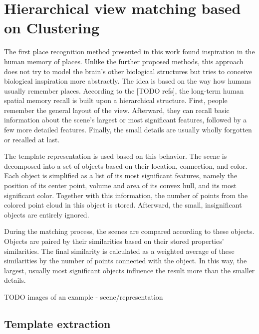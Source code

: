 \section{Hierarchical view matching based on Clustering}

The first place recognition method presented in this work found inspiration in the human memory of places. Unlike the further proposed methods, this approach does not try to model the brain's other biological structures but tries to conceive biological inspiration more abstractly. The idea is based on the way how humans usually remember places. According to the [TODO refs], the long-term human spatial memory recall is built upon a hierarchical structure. First, people remember the general layout of the view. Afterward, they can recall basic information about the scene's largest or most significant features, followed by a few more detailed features. Finally, the small details are usually wholly forgotten or recalled at last.\par
The template representation is used based on this behavior. The scene is decomposed into a set of objects based on their location, connection, and color. Each object is simplified as a list of its most significant features, namely the position of its center point, volume and area of its convex hull, and its most significant color. Together with this information, the number of points from the colored point cloud in this object is stored. Afterward, the small, insignificant objects are entirely ignored.\par
During the matching process, the scenes are compared according to these objects. Objects are paired by their similarities based on their stored properties' similarities. The final similarity is calculated as a weighted average of these similarities by the number of points connected with the object. In this way, the largest, usually most significant objects influence the result more than the smaller details.\par

TODO images of an example - scene/representation

\subsection{Template extraction}

